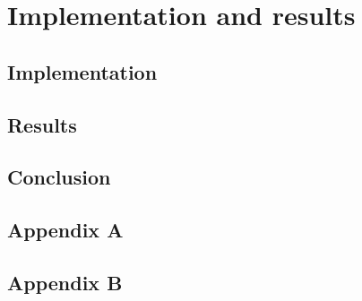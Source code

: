 \documentclass[12pt, twoside]{report}
\begin{document}
\part{Implementation and results}

\chapter{Implementation}


\chapter{Results}

 
\chapter{Conclusion}


\appendix
\chapter{Appendix A}


\chapter{Appendix B}


\printbibliography[heading=bibintoc]
\end{document}
